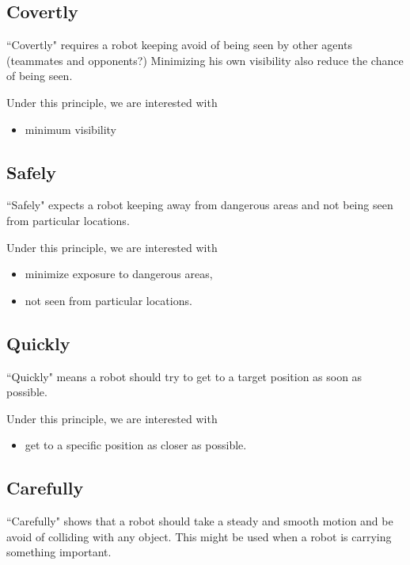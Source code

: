 \documentclass[12pt]{article}
\begin{document}
\subsection{Covertly}

``Covertly" requires a robot keeping avoid of being seen by other agents (teammates and opponents?) Minimizing his own visibility also reduce the chance of being seen.

Under this principle, we are interested with

\begin{itemize}
  \item minimum visibility 
\end{itemize}

\subsection{Safely}

``Safely" expects a robot keeping away from dangerous areas and not being seen from particular locations.

Under this principle, we are interested with

\begin{itemize}
  \item minimize exposure to dangerous areas,
  \item not seen from particular locations.
\end{itemize}

\subsection{Quickly}

``Quickly" means a robot should try to get to a target position as soon as possible. 

Under this principle, we are interested with

\begin{itemize}
  \item get to a specific position as closer as possible.
\end{itemize}

\subsection{Carefully}

``Carefully" shows that a robot should take a steady and smooth motion and be avoid of colliding with any object. This might be used when a robot is carrying something important.
\end{document}
